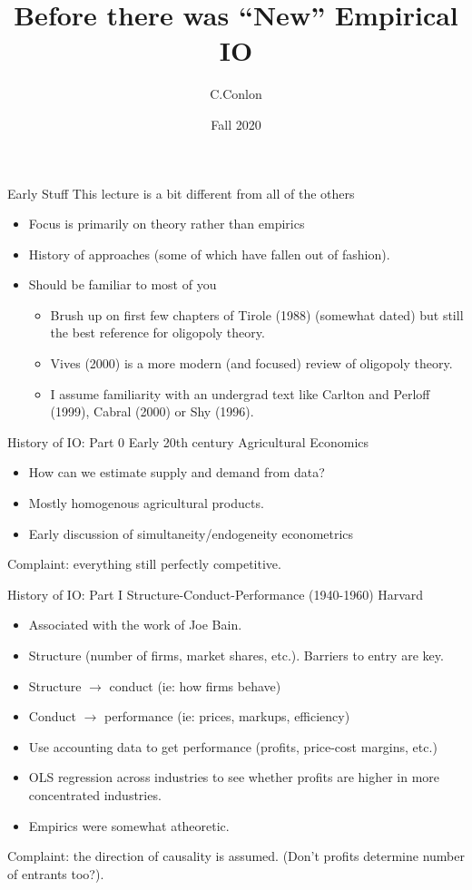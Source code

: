 \documentclass[xcolor=pdftex,dvipsnames,table,mathserif,aspectratio=169]{beamer}
\title [``Old'' IO]{Before there was ``New'' Empirical IO}
\author{C.Conlon}
\institute{Grad IO }
\date{Fall 2020}
\begin{document}
\begin{frame}
\titlepage
\end{frame}

\begin{frame}{Early Stuff}
This lecture is a bit different from all of the others
\begin{itemize}
\item Focus is primarily on theory rather than empirics
\item History of approaches (some of which have fallen out of fashion).
\item Should be familiar to most of you
\begin{itemize}
\item Brush up on first few chapters of Tirole (1988) (somewhat dated) but still the best reference for oligopoly theory.
\item Vives (2000) is a more modern (and focused) review of oligopoly theory.
\item I assume familiarity with an undergrad text like Carlton and Perloff (1999), Cabral (2000) or Shy (1996).
\end{itemize}
\end{itemize}
\end{frame}

\begin{frame}{History of IO: Part 0}
Early 20th century Agricultural Economics
\begin{itemize}
\item How can we estimate supply and demand from data?
\item Mostly homogenous agricultural products.
\item Early discussion of simultaneity/endogeneity econometrics
\end{itemize}
Complaint: everything still perfectly competitive.
\end{frame}

\begin{frame}{History of IO: Part I}
Structure-Conduct-Performance (1940-1960) Harvard
\begin{itemize}
\item Associated with the work of Joe Bain.
\item Structure (number of firms, market shares, etc.). Barriers to entry are key.
\item Structure $\rightarrow$ conduct (ie: how firms behave)
\item Conduct $\rightarrow$ performance (ie: prices, markups, efficiency)
\item Use accounting data to get performance (profits, price-cost margins, etc.)
\item OLS regression across industries to see whether profits are higher in more concentrated industries.
\item Empirics were somewhat atheoretic.
\end{itemize}
Complaint: the direction of causality is assumed. (Don't profits determine number of entrants too?).
\end{frame}
\end{document}
